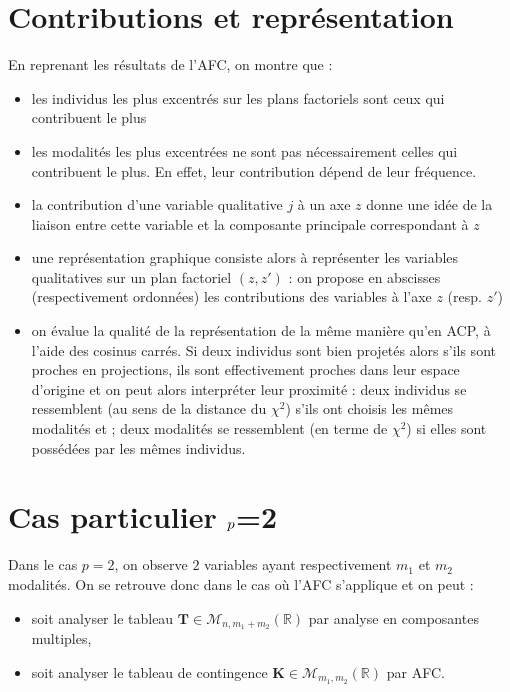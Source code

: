 \documentclass[letterpaper,10pt,english]{jupyterBook}
\begin{document}
\section{Contributions et représentation}
\label{\detokenize{acm:contributions-et-representation}}
\sphinxAtStartPar
En reprenant les résultats de l’AFC, on montre que :
\begin{itemize}
\item {} 
\sphinxAtStartPar
les individus les plus excentrés sur les plans factoriels sont ceux qui contribuent le plus

\item {} 
\sphinxAtStartPar
les modalités les plus excentrées ne sont pas nécessairement celles qui
contribuent le plus. En effet, leur contribution dépend de leur fréquence.

\item {} 
\sphinxAtStartPar
la contribution d’une variable qualitative \(j\) à un axe \(z\) donne une idée de la liaison entre cette variable et la composante principale correspondant à \(z\)

\item {} 
\sphinxAtStartPar
une représentation graphique consiste alors à représenter les variables qualitatives sur un plan factoriel \((z,z')\) : on propose en abscisses (respectivement ordonnées) les contributions des variables à l’axe \(z\) (resp. \(z'\))

\item {} 
\sphinxAtStartPar
on évalue la qualité de la représentation de la même manière qu’en ACP, à l’aide des cosinus carrés. Si deux individus sont bien projetés alors s’ils sont proches en projections, ils sont effectivement proches dans leur espace d’origine et on peut alors interpréter leur proximité :
deux individus se ressemblent (au sens de la distance du \(\chi^2\)) s’ils ont choisis les mêmes modalités et ; deux modalités se ressemblent (en terme de \(\chi^2\)) si elles sont possédées par les mêmes individus.

\end{itemize}


\section{Cas particulier \protect\(p\protect\)=2}
\label{\detokenize{acm:cas-particulier-p-2}}
\sphinxAtStartPar
Dans le cas \(p=2\), on observe \(2\) variables ayant respectivement \(m_1\) et \(m_2\) modalités. On se retrouve donc dans le cas où l’AFC s’applique et on peut :
\begin{itemize}
\item {} 
\sphinxAtStartPar
soit analyser le tableau \(\mathbf{T}\in\mathcal{M}_{n,m_1+m_2}(\mathbb{R})\) par analyse en composantes multiples,

\item {} 
\sphinxAtStartPar
soit analyser le tableau de contingence \(\mathbf{K}\in\mathcal{M}_{m_1,m_2}(\mathbb{R})\) par AFC.

\end{itemize}
\end{document}

